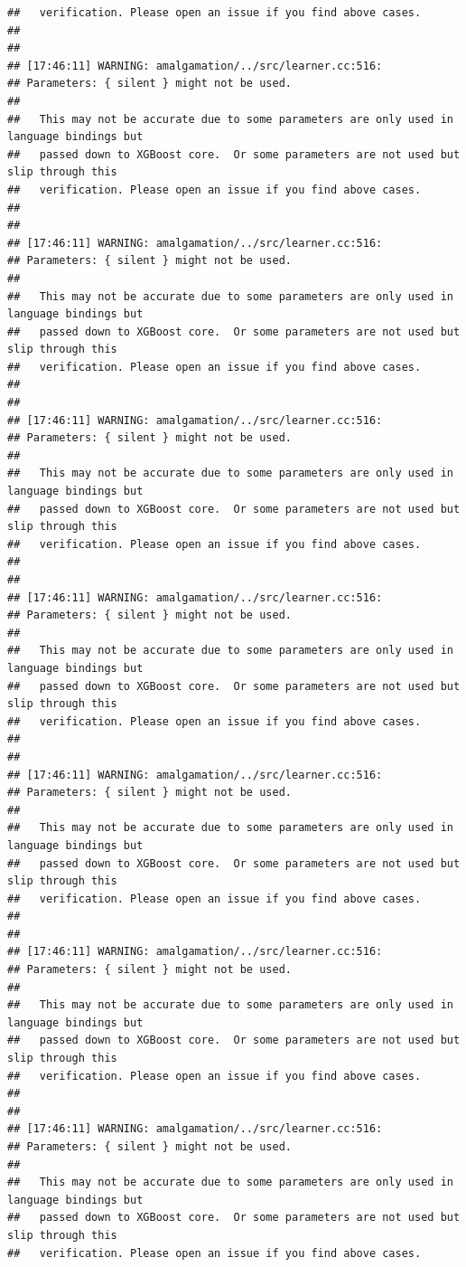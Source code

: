 \documentclass[AMS,STIX2COL]{WileyNJD-v2}\usepackage[]{graphicx}\usepackage[]{color}
\makeatletter
\newenvironment{kframe}{%
 \def\at@end@of@kframe{}%
 \ifinner\ifhmode%
  \def\at@end@of@kframe{\end{minipage}}%
  \begin{minipage}{\columnwidth}%
 \fi\fi%
 \def\FrameCommand##1{\hskip\@totalleftmargin \hskip-\fboxsep
 \colorbox{shadecolor}{##1}\hskip-\fboxsep
     \hskip-\linewidth \hskip-\@totalleftmargin \hskip\columnwidth}%
 \MakeFramed {\advance\hsize-\width
   \@totalleftmargin\z@ \linewidth\hsize
   \@setminipage}}%
 {\par\unskip\endMakeFramed%
 \at@end@of@kframe}
\newenvironment{knitrout}{}{} %
\makeatother
\begin{document}
\begin{knitrout}
\begin{kframe}
\begin{verbatim}
##   verification. Please open an issue if you find above cases.
## 
## 
## [17:46:11] WARNING: amalgamation/../src/learner.cc:516: 
## Parameters: { silent } might not be used.
## 
##   This may not be accurate due to some parameters are only used in language bindings but
##   passed down to XGBoost core.  Or some parameters are not used but slip through this
##   verification. Please open an issue if you find above cases.
## 
## 
## [17:46:11] WARNING: amalgamation/../src/learner.cc:516: 
## Parameters: { silent } might not be used.
## 
##   This may not be accurate due to some parameters are only used in language bindings but
##   passed down to XGBoost core.  Or some parameters are not used but slip through this
##   verification. Please open an issue if you find above cases.
## 
## 
## [17:46:11] WARNING: amalgamation/../src/learner.cc:516: 
## Parameters: { silent } might not be used.
## 
##   This may not be accurate due to some parameters are only used in language bindings but
##   passed down to XGBoost core.  Or some parameters are not used but slip through this
##   verification. Please open an issue if you find above cases.
## 
## 
## [17:46:11] WARNING: amalgamation/../src/learner.cc:516: 
## Parameters: { silent } might not be used.
## 
##   This may not be accurate due to some parameters are only used in language bindings but
##   passed down to XGBoost core.  Or some parameters are not used but slip through this
##   verification. Please open an issue if you find above cases.
## 
## 
## [17:46:11] WARNING: amalgamation/../src/learner.cc:516: 
## Parameters: { silent } might not be used.
## 
##   This may not be accurate due to some parameters are only used in language bindings but
##   passed down to XGBoost core.  Or some parameters are not used but slip through this
##   verification. Please open an issue if you find above cases.
## 
## 
## [17:46:11] WARNING: amalgamation/../src/learner.cc:516: 
## Parameters: { silent } might not be used.
## 
##   This may not be accurate due to some parameters are only used in language bindings but
##   passed down to XGBoost core.  Or some parameters are not used but slip through this
##   verification. Please open an issue if you find above cases.
## 
## 
## [17:46:11] WARNING: amalgamation/../src/learner.cc:516: 
## Parameters: { silent } might not be used.
## 
##   This may not be accurate due to some parameters are only used in language bindings but
##   passed down to XGBoost core.  Or some parameters are not used but slip through this
##   verification. Please open an issue if you find above cases.

\end{verbatim}
\end{kframe}
\end{knitrout}
\end{document}
